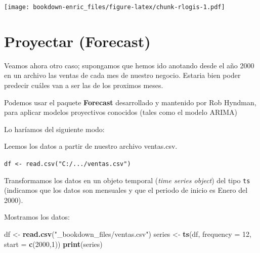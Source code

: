 \documentclass[]{book}
\newenvironment{Shaded}{\begin{snugshade}}{\end{snugshade}}
\newcommand{\KeywordTok}[1]{\textcolor[rgb]{0.13,0.29,0.53}{\textbf{{#1}}}}
\newcommand{\DataTypeTok}[1]{\textcolor[rgb]{0.13,0.29,0.53}{{#1}}}
\newcommand{\DecValTok}[1]{\textcolor[rgb]{0.00,0.00,0.81}{{#1}}}
\newcommand{\StringTok}[1]{\textcolor[rgb]{0.31,0.60,0.02}{{#1}}}
\newcommand{\NormalTok}[1]{{#1}}
\theoremstyle{definition}
\theoremstyle{definition}
\theoremstyle{remark}
\begin{document}
\texttt{[image: bookdown-enric\_files/figure-latex/chunk-rlogis-1.pdf]}

\section{Proyectar (Forecast)}\label{proyectar-forecast}

Veamos ahora otro caso; supongamos que hemos ido anotando desde el año
2000 en un archivo las ventas de cada mes de nuestro negocio. Estaria
bien poder predecir cuáles van a ser las de los proximos meses.

Podemos usar el paquete \textbf{Forecast} \citep{R-forecast}
desarrollado y mantenido por Rob Hyndman, para aplicar modelos
proyectivos conocidos (tales como el modelo ARIMA)

Lo haríamos del siguiente modo:

Leemos los datos a partir de nuestro archivo ventas.csv.

\texttt{df\ \textless{}-\ read.csv("C:/.../ventas.csv")}

Transformamos los datos en un objeto temporal (\emph{time series
object}) del tipo \texttt{ts} (indicamos que los datos son mensuales y
que el periodo de inicio es Enero del 2000).

Mostramos los datos:

\begin{Shaded}
\begin{Highlighting}[]
\NormalTok{df <-}\StringTok{ }\KeywordTok{read.csv}\NormalTok{(}\StringTok{"_bookdown_files/ventas.csv"}\NormalTok{)}
\NormalTok{series <-}\StringTok{ }\KeywordTok{ts}\NormalTok{(df, }\DataTypeTok{frequency =} \DecValTok{12}\NormalTok{, }\DataTypeTok{start =} \KeywordTok{c}\NormalTok{(}\DecValTok{2000}\NormalTok{,}\DecValTok{1}\NormalTok{))}
\KeywordTok{print}\NormalTok{(series)}
\end{Highlighting}
\end{Shaded}
\end{document}
